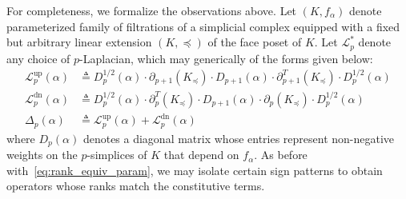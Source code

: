 For completeness, we formalize the observations above. Let $(K, f_\alpha)$ denote parameterized family of filtrations of a simplicial complex equipped with a fixed but arbitrary linear extension $(K, \preceq)$ of the face poset of $K$. 
Let $\mathcal{L}_p^\ast$ denote any choice of $p$-Laplacian, which may generically of the forms given below: 
\begin{align}\label{eq:laplacian_decouple}
\mathcal{L}_p^{\text{up}}(\alpha) & \triangleq D_p^{1/2}(\alpha) \cdot \partial_{p+1}(K_\preceq) \cdot D_{p+1}(\alpha) \cdot \partial_{p+1}^T(K_\preceq) \cdot D_p^{1/2}(\alpha) \\ 
\mathcal{L}_p^{\text{dn}}(\alpha) & \triangleq D_p^{1/2}(\alpha) \cdot \partial_p^T(K_\preceq) \cdot D_{p+1}(\alpha) \cdot \partial_p(K_\preceq) \cdot D_p^{1/2}(\alpha) \\
\Delta_p(\alpha) & \triangleq \mathcal{L}_p^{\text{up}}(\alpha) + \mathcal{L}_p^{\text{dn}}(\alpha) 
\end{align}
where $D_p(\alpha)$ denotes a diagonal matrix whose entries represent non-negative weights on the $p$-simplices of $K$ that depend on $f_\alpha$. 
As before with~\eqref{eq:rank_equiv_param}, we may isolate certain sign patterns to obtain operators whose ranks match the constitutive terms. 	


 
